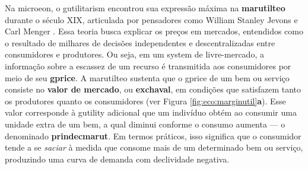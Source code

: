 \documentclass[./main.tex]{subfiles}
\begin{document}
\par Na \gls{microeon}, o \gls{gutilitarism} encontrou sua expressão máxima na \textbf{\gls{marutilteo}} durante o século XIX, articulada por pensadores como William Stanley Jevons e Carl Menger \cite{Gordon2002a}. Essa \gls{teoria} busca explicar os preços em mercados, entendidos como o resultado de milhares de decisões independentes e descentralizadas entre consumidores e produtores. Ou seja, em um \gls{system} de livre-mercado, a informação sobre a escassez de um recurso é transmitida aos consumidores por meio de seu \textbf{\gls{gprice}}. A \gls{marutilteo} sustenta que o \gls{gprice} de um bem ou serviço consiste no \textbf{valor de mercado}, ou \textbf{\gls{exchaval}}, em condições que satisfazem tanto os produtores quanto os consumidores (ver Figura \ref{fig:eco:marginutil}\textbf{a}). Esse valor corresponde à \gls{gutility} adicional que um indivíduo obtém ao consumir uma unidade extra de um bem, a qual diminui conforme o consumo aumenta — o denominado \textbf{\gls{prindecmarut}}. Em termos práticos, isso significa que o consumidor tende a se \textit{saciar} à medida que consome mais de um determinado bem ou serviço, produzindo uma curva de demanda com declividade negativa. 
\end{document}
